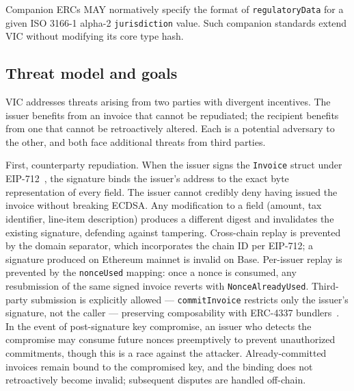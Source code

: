 \documentclass[11pt,a4paper]{article}
\begin{document}
Companion ERCs MAY normatively specify the format of \texttt{regulatoryData} for a
given ISO 3166-1 alpha-2 \texttt{jurisdiction} value. Such companion standards
extend VIC without modifying its core type hash.

\subsection{Threat model and goals}

VIC addresses threats arising from two parties with divergent incentives. The issuer benefits from an invoice that cannot be repudiated; the recipient benefits from one that cannot be retroactively altered. Each is a potential adversary to the other, and both face additional threats from third parties.

First, counterparty repudiation. When the issuer signs the \texttt{Invoice} struct under EIP-712~\cite{eip712}, the signature binds the issuer's address to the exact byte representation of every field. The issuer cannot credibly deny having issued the invoice without breaking ECDSA. Any modification to a field (amount, tax identifier, line-item description) produces a different digest and invalidates the existing signature, defending against tampering. Cross-chain replay is prevented by the domain separator, which incorporates the chain ID per EIP-712; a signature produced on Ethereum mainnet is invalid on Base. Per-issuer replay is prevented by the \texttt{nonceUsed} mapping: once a nonce is consumed, any resubmission of the same signed invoice reverts with \texttt{NonceAlreadyUsed}. Third-party submission is explicitly allowed --- \texttt{commitInvoice} restricts only the issuer's signature, not the caller --- preserving composability with ERC-4337 bundlers~\cite{erc4337}. In the event of post-signature key compromise, an issuer who detects the compromise may consume future nonces preemptively to prevent unauthorized commitments, though this is a race against the attacker. Already-committed invoices remain bound to the compromised key, and the binding does not retroactively become invalid; subsequent disputes are handled off-chain.
\end{document}
